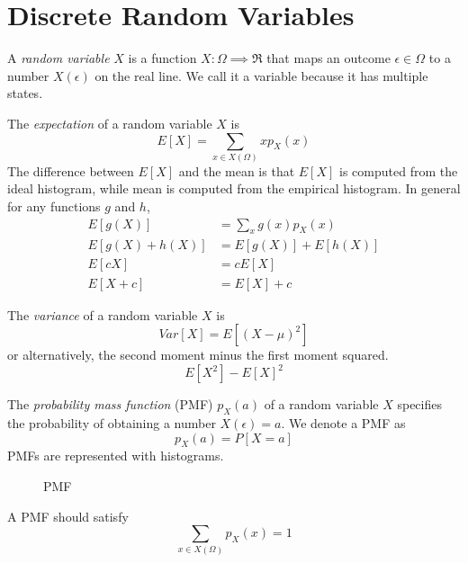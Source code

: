 \section{Discrete Random Variables}

A \emph{random variable} $X$ is a function $X : \Omega \implies \Re$
that maps an outcome $\epsilon \in \Omega$ to a number $X(\epsilon)$ on the real line.
We call it a variable because it has multiple states.

The \emph{expectation} of a random variable $X$ is
\begin{equation}
    E[X] = \sum_{x\in X(\Omega)} xp_X(x)
\end{equation}
The difference between $E[X]$ and the mean is
that $E[X]$ is computed from the ideal histogram,
while mean is computed from the empirical histogram.
In general for any functions $g$ and $h$,
\begin{align}
    E[g(X)]        & = \sum_{x} g(x)p_X(x) \\
    E[g(X) + h(X)] & = E[g(X)] + E[h(X)]   \\
    E[cX]          & = cE[X]               \\
    E[X + c]       & = E[X] + c
\end{align}

The \emph{variance} of a random variable $X$ is
\begin{equation}
    Var[X] = E\left[(X-\mu)^2\right]
\end{equation}
or alternatively, the second moment
minus the first moment squared.
\begin{equation}
    E[X^2] - E[X]^2
\end{equation}

The \emph{probability mass function} (PMF) $p_X(a)$
of a random variable $X$ specifies the probability of
obtaining a number $X(\epsilon) = a$. We denote a PMF as
\begin{equation}
    p_X(a) = P[X = a]
\end{equation}
PMFs are represented with histograms.
\begin{figure}[h]
    \centering
    \caption{PMF}
\end{figure}
A PMF should satisfy
\begin{equation}
    \sum_{x\in X(\Omega)} p_X(x) = 1
\end{equation}

